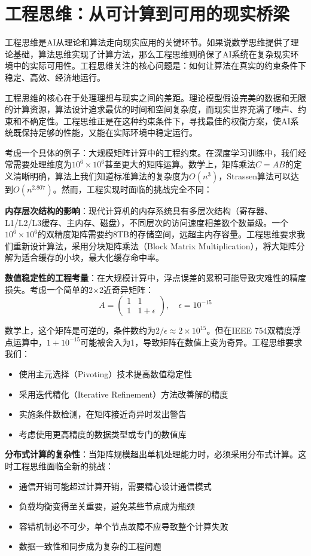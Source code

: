\section{工程思维：从可计算到可用的现实桥梁}

工程思维是AI从理论和算法走向现实应用的关键环节。如果说数学思维提供了理论基础，算法思维实现了计算方法，那么工程思维则确保了AI系统在复杂现实环境中的实际可用性。工程思维关注的核心问题是：如何让算法在真实的约束条件下稳定、高效、经济地运行。

工程思维的核心在于处理理想与现实之间的差距。理论模型假设完美的数据和无限的计算资源，算法设计追求最优的时间和空间复杂度，而现实世界充满了噪声、约束和不确定性。工程思维正是在这种约束条件下，寻找最佳的权衡方案，使AI系统既保持足够的性能，又能在实际环境中稳定运行。

考虑一个具体的例子：大规模矩阵计算中的工程约束。在深度学习训练中，我们经常需要处理维度为$10^6 \times 10^6$甚至更大的矩阵运算。数学上，矩阵乘法$C = AB$的定义清晰明确，算法上我们知道标准算法的复杂度为$O(n^3)$，Strassen算法可以达到$O(n^{2.807})$。然而，工程实现时面临的挑战完全不同：

\textbf{内存层次结构的影响}：现代计算机的内存系统具有多层次结构（寄存器、L1/L2/L3缓存、主内存、磁盘），不同层次的访问速度相差数个数量级。一个$10^6 \times 10^6$的双精度矩阵需要约8TB的存储空间，远超主内存容量。工程思维要求我们重新设计算法，采用分块矩阵乘法（Block Matrix Multiplication），将大矩阵分解为适合缓存的小块，最大化缓存命中率。

\textbf{数值稳定性的工程考量}：在大规模计算中，浮点误差的累积可能导致灾难性的精度损失。考虑一个简单的2×2近奇异矩阵：
$$A = \begin{pmatrix} 1 & 1 \\ 1 & 1+\epsilon \end{pmatrix}, \quad \epsilon = 10^{-15}$$

数学上，这个矩阵是可逆的，条件数约为$2/\epsilon \approx 2 \times 10^{15}$。但在IEEE 754双精度浮点运算中，$1 + 10^{-15}$可能被舍入为1，导致矩阵在数值上变为奇异。工程思维要求我们：
\begin{itemize}
\item 使用主元选择（Pivoting）技术提高数值稳定性
\item 采用迭代精化（Iterative Refinement）方法改善解的精度
\item 实施条件数检测，在矩阵接近奇异时发出警告
\item 考虑使用更高精度的数据类型或专门的数值库
\end{itemize}

\textbf{分布式计算的复杂性}：当矩阵规模超出单机处理能力时，必须采用分布式计算。这时工程思维面临全新的挑战：
\begin{itemize}
\item 通信开销可能超过计算开销，需要精心设计通信模式
\item 负载均衡变得至关重要，避免某些节点成为瓶颈
\item 容错机制必不可少，单个节点故障不应导致整个计算失败
\item 数据一致性和同步成为复杂的工程问题
\end{itemize}

